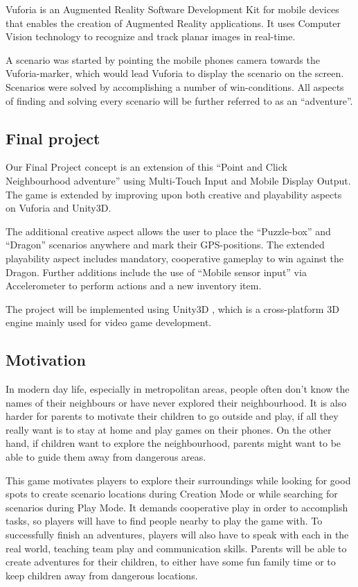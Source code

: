 \documentclass{sigchi-ext}
\begin{document}
Vuforia is an Augmented Reality Software Development Kit for mobile devices that enables the creation of Augmented Reality applications. It uses Computer Vision technology to recognize and track planar images in real-time. \cite{vuforiaExplanation}

A scenario was started by pointing the mobile phones camera towards the Vuforia-marker, which would lead Vuforia to display the scenario on the screen. Scenarios were solved by accomplishing a number of win-conditions. All aspects of finding and solving every scenario will be further referred to as an ``adventure''. 

\subsection{Final project}

Our Final Project concept is an extension of this ``Point and Click Neighbourhood adventure'' using Multi-Touch Input and Mobile Display Output. The game is extended by improving upon both creative and playability aspects on Vuforia and Unity3D.

The additional creative aspect allows the user to place the ``Puzzle-box'' and ``Dragon'' scenarios anywhere and  mark their GPS-positions. The extended playability aspect includes mandatory, cooperative gameplay to win against the Dragon. Further additions include the use of ``Mobile sensor input'' via Accelerometer to perform actions and a new inventory item.

The project will be implemented using Unity3D \cite{unity3d}, which is a cross-platform 3D engine mainly used for video game development. 

\subsection{Motivation}

In modern day life, especially in metropolitan areas, people often don't know the names of their neighbours or have never explored their neighbourhood. It is also harder for parents to motivate their children to go outside and play, if all they really want is to stay at home and play games on their phones. On the other hand, if children want to explore the neighbourhood, parents might want to be able to guide them away from dangerous areas.

This game motivates players to explore their surroundings while looking for good spots to create scenario locations during Creation Mode or while searching for scenarios during Play Mode. It demands cooperative play in order to accomplish tasks, so players will have to find people nearby to play the game with. To successfully finish an adventures, players will also have to speak with each in the real world, teaching team play and communication skills. Parents will be able to create adventures for their children, to either have some fun family time or to keep children away from dangerous locations.
\end{document}
